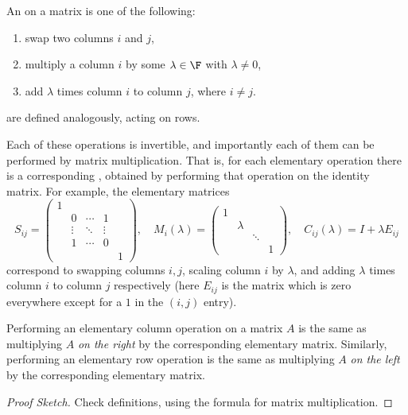 \begin{definition}
    An  on a matrix is one of the following:
    \begin{enumerate}[label=(\roman*)]
        \item swap two columns $i$ and $j$,
        \item multiply a column $i$ by some $\lambda \in \F$ with $\lambda \neq 0$,
        \item add $\lambda$ times column $i$ to column $j$, where $i \neq j$.
    \end{enumerate}
     are defined analogously, acting on rows.
\end{definition}

Each of these operations is invertible, and importantly each of them can be performed by matrix multiplication. That is, for each elementary operation there is a corresponding , obtained by performing that operation on the identity matrix. For example, the elementary matrices
$$
S_{ij} = \begin{pmatrix}
    1 & & & & \\
    & 0 & \cdots & 1 & \\
    & \vdots & \ddots & \vdots & \\
    & 1 & \cdots & 0 & \\
    & & & & 1
\end{pmatrix}, \quad
M_{i}(\lambda) = \begin{pmatrix}
    1 & & & \\
    & \lambda & & \\
    & & \ddots & \\
    & & & 1
\end{pmatrix}, \quad
C_{ij}(\lambda) = I + \lambda E_{ij}
$$
correspond to swapping columns $i, j$, scaling column $i$ by $\lambda$, and adding $\lambda$ times column $i$ to column $j$ respectively (here $E_{ij}$ is the matrix which is zero everywhere except for a $1$ in the $(i, j)$ entry).

\begin{lemma}
    Performing an elementary column operation on a matrix $A$ is the same as multiplying $A$ \emph{on the right} by the corresponding elementary matrix. Similarly, performing an elementary row operation is the same as multiplying $A$ \emph{on the left} by the corresponding elementary matrix.
\end{lemma}
\begin{proof}[Proof Sketch]
    Check definitions, using the formula for matrix multiplication.
\end{proof}

